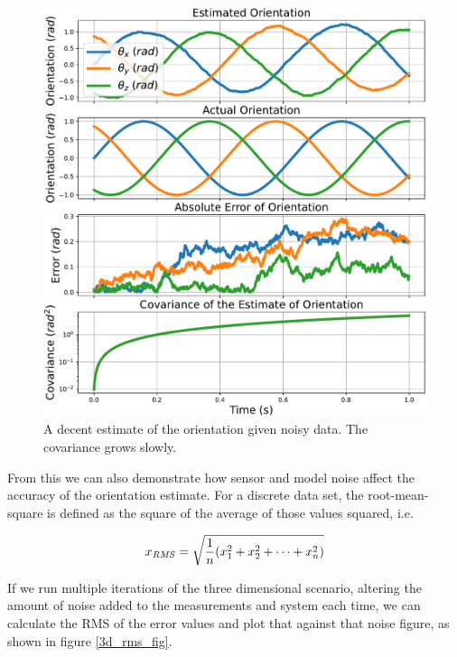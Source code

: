 \documentclass[12pt]{article}
\begin{document}
\begin{figure}[thp]
	\centering
	
	\includegraphics[width=\textwidth]{3d-orientation.pdf}
	
	\caption{A decent estimate of the orientation given noisy data. The covariance grows slowly.}
	\label{3d_orient_fig}
\end{figure}

From this we can also demonstrate how sensor and model noise affect the accuracy of the orientation estimate. For a discrete data set, the root-mean-square is defined as the square of the average of those values squared, i.e.

\newcommand{\RMS}{\ensuremath{\mathit{RMS}}} %
\begin{equation}
	x_\RMS = \sqrt{{1 \over n}(x_1^2 + x_2^2 + \dots + x_n^2)}
\end{equation}

If we run multiple iterations of the three dimensional scenario, altering the amount of noise added to the measurements and system each time, we can calculate the RMS of the error values and plot that against that noise figure, as shown in figure \ref{3d_rms_fig}.
\end{document}
